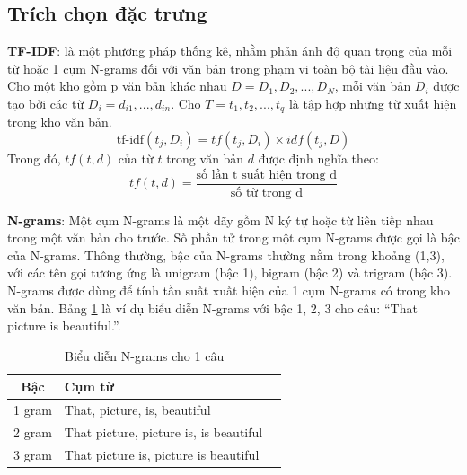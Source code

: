 \subsection{Trích chọn đặc trưng}
\textbf{TF-IDF}: là một phương pháp thống kê, nhằm phản ánh độ quan trọng của mỗi từ hoặc
1 cụm N-grams đối với văn bản trong phạm vi toàn bộ tài liệu đầu vào. Cho một kho gồm p văn 
bản khác nhau $D={D_1, D_2, ..., D_N}$, mỗi văn bản $D_i$ được tạo bởi các từ $D_i={d_{i1}, ..., 
d_{in}}$. Cho $T={t_1, t_2, ..., t_q}$ là tập hợp những từ xuất hiện trong kho văn bản.
\begin{equation}
    \text{tf-idf}(t_j, D_i) = tf(t_j, D_i)\times idf(t_j, D)
\end{equation}
Trong đó, $tf(t,d)$ của từ $t$ trong văn bản $d$ được định nghĩa theo:
\begin{equation}
    tf(t,d)=\frac{\text{số lần t suất hiện trong d}}{\text{số từ trong d}}
\end{equation}

\textbf{N-grams}: Một cụm N-grams là một dãy gồm N ký tự hoặc từ liên tiếp nhau trong một văn 
bản cho trước. Số phần tử trong một cụm N-grams được gọi là bậc của N-grams. Thông thường, bậc 
của N-grams thường nằm trong khoảng (1,3), với các tên gọi tương ứng là unigram (bậc 1), 
bigram (bậc 2) và trigram (bậc 3). N-grams được dùng để tính tần suất xuất hiện của 1 cụm 
N-grams có trong kho văn bản. Bảng \ref{ngram} là ví dụ biểu diễn N-grams với bậc 1, 2, 3 cho câu: 
“That picture is beautiful.”.
\begin{table}[htbp]
    \centering
    \label{ngram}
    \begin{tabularx}{\textwidth}{|c|X|X|}
        \hline
        Bậc    & Cụm từ                                 \\ \hline
        1 gram & That, picture, is, beautiful           \\ \hline
        2 gram & That picture, picture is, is beautiful \\ \hline
        3 gram & That picture is, picture is beautiful  \\ \hline
    \end{tabularx}
    \caption{Biểu diễn N-grams cho 1 câu}
\end{table}

